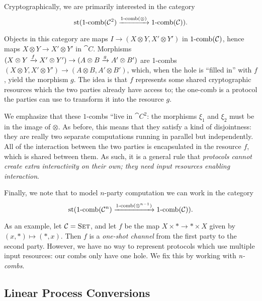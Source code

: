 Cryptographically, we are primarily interested in the category \[
  \operatorname*{st}(\operatorname*{1-comb}({\mathcal{C}}^2)\xrightarrow{\operatorname*{1-comb}(\otimes)}\operatorname*{1-comb}({\mathcal{C}})).
\]

Objects in this category are maps $I\to (X\otimes Y, X'\otimes Y')$ in
$\operatorname*{1-comb}({\mathcal{C}})$, hence maps $X\otimes Y\to X'\otimes Y'$ in $\cat{C}$.
Morphisms $(X\otimes Y\xrightarrow{f} X'\otimes Y')\to(A\otimes B\xrightarrow{g} A'\otimes B')$
are 1-combs $(X\otimes Y, X'\otimes Y')\to (A\otimes B, A'\otimes B')$, which,
when the hole is ``filled in'' with $f$, yield the morphism $g$. The idea is
that $f$ represents some shared cryptographic resources which the two parties
already have access to; the one-comb is a protocol the parties can use to
transform it into the resource $g$.

We emphasize that these $1$-combs ``live in $\cat{C}^2$: the morphisms $\xi_1$
and $\xi_2$ must be in the image of $\otimes$. As before, this means that they
satisfy a kind of disjointness: they are really two separate computations
running in parallel but independently. All of the interaction between the two
parties is encapsulated in the resource $f$, which is shared between them. As
such, it is a general rule that \emph{protocols cannot create extra
  interactivity on their own; they need input resources enabling interaction}.

Finally, we note that to model $n$-party computation we can work in the category \[
  \operatorname*{st}(\operatorname*{1-comb}({\mathcal{C}}^n)\xrightarrow{\operatorname*{1-comb}(\otimes^{n-1})}\operatorname*{1-comb}({\mathcal{C}})).
\]

As an example, let ${\mathcal{C}} = {\textsc{\text{Set}}}$, and let $f$ be the map $X\times *\to
*\times X$ given by $(x, *)\mapsto (*, x)$. Then $f$ is a \emph{one-shot channel}
from the first party to the second party. However, we have no way to represent
protocols which use multiple input resources: our combs only have one hole. We
fix this by working with \emph{n-combs}.

\subsection{Linear Process Conversions}

